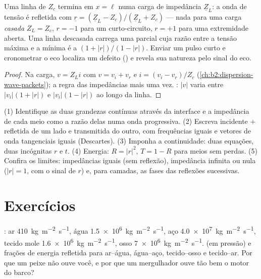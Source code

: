 \begin{proposition}\label{prop:b2:wave-interfaces:coax}
Uma linha de  $Z_c$ termina em $x = \ell$ numa carga de
impedância $\underline Z_L$: a onda de tensão é refletida com $\underline r =
(\underline Z_L - Z_c)/(\underline Z_L + Z_c)$ --- nada para uma carga \emph{casada}
$Z_L = Z_c$, $r = -1$ para um curto-circuito, $r = +1$ para uma extremidade aberta. Uma
linha descasada carrega uma  parcial cuja razão entre a tensão máxima
e a mínima é a \emph{} $(1 + |r|)/(1 - |r|)$.
Enviar um pulso curto e cronometrar o eco localiza um defeito () e revela sua natureza pelo sinal do eco.
\end{proposition}

\begin{proof}
Na carga, $v = Z_Li$ com $v = v_i + v_r$ e $i = (v_i - v_r)/Z_c$
(\cref{ch:b2:dispersion-wave-packets}); a regra das impedâncias mais uma vez.
: $|v|$ varia entre $|v_i|(1 + |r|)$ e $|v_i|(1 -
|r|)$ ao longo da linha.
\end{proof}

\begin{method}\label{met:b2:wave-interfaces:method}
(1) Identifique as duas grandezas contínuas através da interface e
a impedância de cada meio como a razão delas numa onda progressiva.
(2) Escreva incidente $+$ refletida de um lado e transmitida do outro,
com frequências iguais e vetores de onda tangenciais iguais (Descartes).
(3) Imponha a continuidade: duas equações, duas incógnitas $r$ e $t$. (4) Energia:
$R = |r|^2$, $T = 1 - R$ para meios sem perdas. (5) Confira os limites: impedâncias
iguais (sem reflexão), impedância infinita ou nula ($|r| = 1$, com o sinal
de $r$) e, para camadas, as fases das reflexões sucessivas.
\end{method}

\section{Exercícios}

\begin{exercise}[$\star$]\label{exo:b2:wave-interfaces:1}
: ar \qty{410}{kg.m^{-2}.s^{-1}}, água \qty{1.5e6}{kg.m^{-2}.s^{-1}},
aço \qty{4.0e7}{kg.m^{-2}.s^{-1}}, tecido mole \qty{1.6e6}{kg.m^{-2}.s^{-1}}, osso
\qty{7e6}{kg.m^{-2}.s^{-1}}.  (em pressão) e frações
de energia refletida para ar--água, água--aço, tecido--osso e
tecido--ar. Por que um peixe não ouve você, e por que um mergulhador ouve
tão bem o motor do barco?
\end{exercise}

